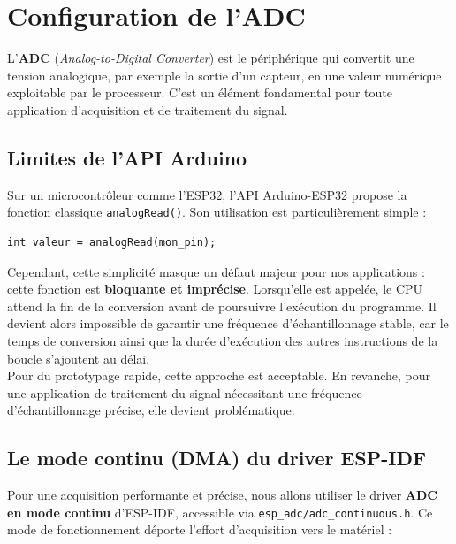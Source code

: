 








\section{Configuration de l'ADC}

L'\textbf{ADC} (\textit{Analog-to-Digital Converter}) est le périphérique qui convertit une tension analogique, par exemple la sortie d'un capteur, en une valeur numérique exploitable par le processeur. C'est un élément fondamental pour toute application d'acquisition et de traitement du signal.

\subsection{Limites de l'API Arduino}

Sur un microcontrôleur comme l'ESP32, l'API Arduino-ESP32 propose la fonction classique \texttt{analogRead()}. Son utilisation est particulièrement simple :

\begin{verbatim}
int valeur = analogRead(mon_pin);
\end{verbatim}

Cependant, cette simplicité masque un défaut majeur pour nos applications : cette fonction est \textbf{bloquante et imprécise}. Lorsqu'elle est appelée, le CPU attend la fin de la conversion avant de poursuivre l'exécution du programme. Il devient alors impossible de garantir une fréquence d'échantillonnage stable, car le temps de conversion ainsi que la durée d'exécution des autres instructions de la boucle s'ajoutent au délai.\\

Pour du prototypage rapide, cette approche est acceptable. En revanche, pour une application de traitement du signal nécessitant une fréquence d'échantillonnage précise, elle devient problématique.

\subsection{Le mode continu (DMA) du driver ESP-IDF}

Pour une acquisition performante et précise, nous allons utiliser le driver \textbf{ADC en mode continu} d'ESP-IDF, accessible via \texttt{esp\_adc/adc\_continuous.h}. Ce mode de fonctionnement déporte l'effort d'acquisition vers le matériel :

